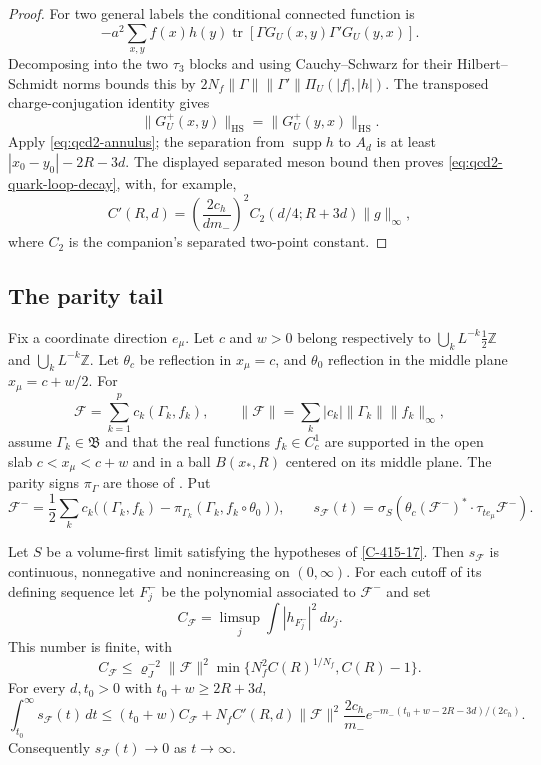 \documentclass[11pt,letterpaper,reqno]{amsart}
\makeatletter
\theoremstyle{definition}
\newcommand{\ms@minorstart}{%
  \pushQED{\qed}\renewcommand{\qedsymbol}{$\blacksquare$}}
\newenvironment{proposition}[1][]{\ms@minorstart\ms@proposition[#1]}
  {\popQED\endms@proposition}
\theoremstyle{remark}
\makeatother
\begin{document}
\begin{proof}
For two general labels the conditional connected
function is
\[
 -a^2\sum_{x,y}f(x)h(y)
                \operatorname{tr}[\Gamma G_U(x,y)\Gamma'G_U(y,x)].
\]
Decomposing into the two $\tau_3$ blocks and using
Cauchy--Schwarz for their Hilbert--Schmidt norms
bounds this by
$2N_f\|\Gamma\|\|\Gamma'\|\Pi_U(|f|,|h|)$.
The transposed charge-conjugation identity gives
\[
 \|G_U^+(x,y)\|_{\mathrm{HS}}
 =\|G_U^+(y,x)\|_{\mathrm{HS}}.
\]
Apply \eqref{eq:qcd2-annulus}; the separation
from $\operatorname{supp}h$ to $A_d$ is at least
$|x_0-y_0|-2R-3d$. The displayed separated meson
bound then proves \eqref{eq:qcd2-quark-loop-decay},
with, for example,
\[
 C'(R,d)=\left(\frac{2c_h}{dm_-}\right)^2
                   C_2(d/4;R+3d)\|g\|_\infty,
\]
where $C_2$ is the companion's separated two-point
constant.
\end{proof}

\subsection{The parity tail}

Fix a coordinate direction $e_\mu$. Let $c$ and $w>0$
belong respectively to
$\bigcup_k L^{-k}\frac12\mathbb Z$ and
$\bigcup_k L^{-k}\mathbb Z$. Let $\theta_c$ be
reflection in $x_\mu=c$, and $\theta_0$ reflection
in the middle plane $x_\mu=c+w/2$. For
\[
 \mathcal F=\sum_{k=1}^p c_k(\Gamma_k,f_k),\qquad
 \|\mathcal F\|=\sum_k|c_k|\|\Gamma_k\|\|f_k\|_\infty,
\]
assume $\Gamma_k\in\mathfrak B$ and that the real functions
$f_k\in C_c^1$ are supported
in the open slab $c<x_\mu<c+w$ and in a ball
$B(x_*,R)$ centered on its middle plane. The parity
signs $\pi_\Gamma$ are those of \cite{QCDM1}. Put
\[
 \mathcal F^-=\frac12\sum_kc_k
       \bigl((\Gamma_k,f_k)-\pi_{\Gamma_k}
                                    (\Gamma_k,f_k\circ\theta_0)\bigr),
 \qquad s_{\mathcal F}(t)
   =\sigma_S(\theta_c(\mathcal F^-)^*\cdot
                               \tau_{te_\mu}\mathcal F^-).
\]

\begin{proposition}[Decay of the parity-odd part]\label{C-401-45}
Let $S$ be a volume-first limit satisfying the
hypotheses of \cref{C-415-17}. Then $s_{\mathcal F}$
is continuous, nonnegative and nonincreasing on
$(0,\infty)$. For each cutoff of its defining
sequence let $F_j^-$ be the polynomial associated
to $\mathcal F^-$ and set
\[
 C_{\mathcal F}=\limsup_j\int|h_{F_j^-}|^2\,d\nu_j.
\]
This number is finite, with
\[
 C_{\mathcal F}\le\varrho_J^{-2}\|\mathcal F\|^2
                  \min\{N_f^2C(R)^{1/N_f},C(R)-1\}.
\]
For every $d,t_0>0$ with $t_0+w\ge2R+3d$,
\begin{equation}\label{eq:qcd2-parity-tail}
 \int_{t_0}^\infty s_{\mathcal F}(t)\,dt
 \le(t_0+w)C_{\mathcal F}
   +N_fC'(R,d)\|\mathcal F\|^2\frac{2c_h}{m_-}
                e^{-m_-(t_0+w-2R-3d)/(2c_h)}.
\end{equation}
Consequently $s_{\mathcal F}(t)\to0$ as $t\to\infty$.
\end{proposition}
\end{document}
